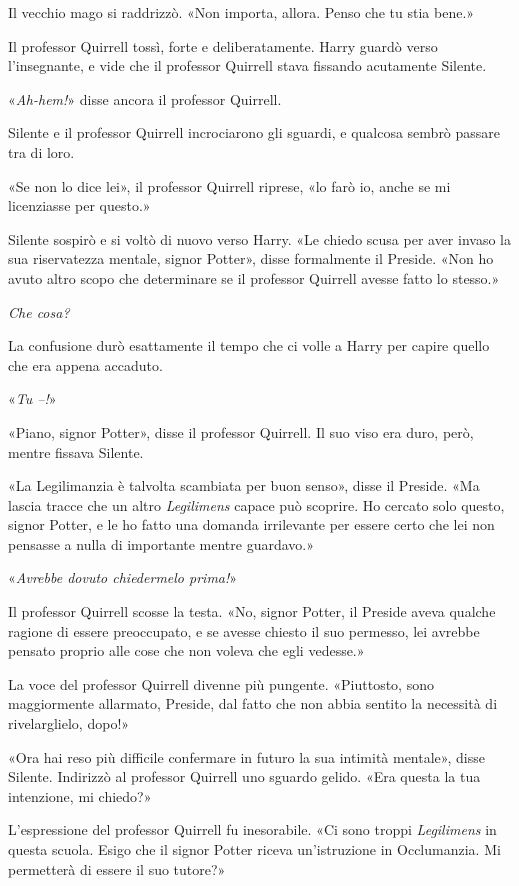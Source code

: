 Il vecchio mago si raddrizzò. «Non importa, allora. Penso che tu stia bene.»

Il professor Quirrell tossì, forte e deliberatamente. Harry guardò verso l’insegnante, e vide che il professor Quirrell stava fissando acutamente Silente.

«\textit{Ah-hem!}» disse ancora il professor Quirrell.

Silente e il professor Quirrell incrociarono gli sguardi, e qualcosa sembrò passare tra di loro.

«Se non lo dice lei», il professor Quirrell riprese, «lo farò io, anche se mi licenziasse per questo.»

Silente sospirò e si voltò di nuovo verso Harry. «Le chiedo scusa per aver invaso la sua riservatezza mentale, signor Potter», disse formalmente il Preside. «Non ho avuto altro scopo che determinare se il professor Quirrell avesse fatto lo stesso.»

\textit{Che cosa?}

La confusione durò esattamente il tempo che ci volle a Harry per capire quello che era appena accaduto.

«\textit{Tu –!}»

«Piano, signor Potter», disse il professor Quirrell. Il suo viso era duro, però, mentre fissava Silente.

«La Legilimanzia è talvolta scambiata per buon senso», disse il Preside. «Ma lascia tracce che un altro \textit{Legilimens} capace può scoprire. Ho cercato solo questo, signor Potter, e le ho fatto una domanda irrilevante per essere certo che lei non pensasse a nulla di importante mentre guardavo.»

«\textit{Avrebbe dovuto chiedermelo prima!}»

Il professor Quirrell scosse la testa. «No, signor Potter, il Preside aveva qualche ragione di essere preoccupato, e se avesse chiesto il suo permesso, lei avrebbe pensato proprio alle cose che non voleva che egli vedesse.»

La voce del professor Quirrell divenne più pungente. «Piuttosto, sono maggiormente allarmato, Preside, dal fatto che non abbia sentito la necessità di rivelarglielo, dopo!»

«Ora hai reso più difficile confermare in futuro la sua intimità mentale», disse Silente. Indirizzò al professor Quirrell uno sguardo gelido. «Era questa la tua intenzione, mi chiedo?»

L’espressione del professor Quirrell fu inesorabile. «Ci sono troppi \textit{Legilimens} in questa scuola. Esigo che il signor Potter riceva un’istruzione in Occlumanzia. Mi permetterà di essere il suo tutore?»

